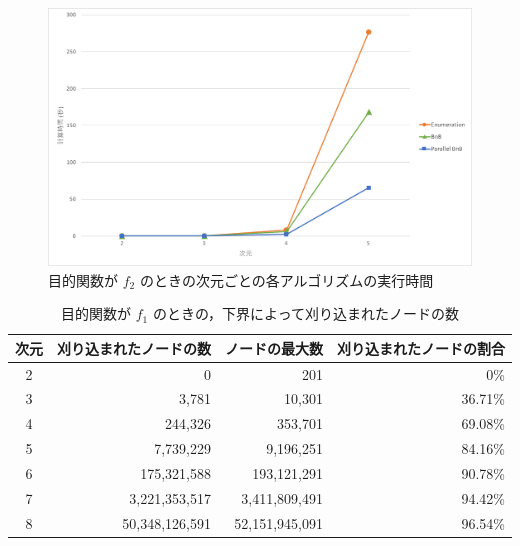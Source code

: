 \documentclass[a4paper,11pt]{jreport}
\begin{document}
\begin{figure}[h]
\begin{center}
\includegraphics[width=15cm]{graphs/f_2_time.pdf}
\caption{目的関数が $ f_2 $ のときの次元ごとの各アルゴリズムの実行時間}
\label{fig:f_2_time}
\end{center}
\end{figure}

\newpage

\begin{table}[h]
\caption{目的関数が $ f_1 $ のときの，下界によって刈り込まれたノードの数}
\label{tbl:f_1_eliminated}
\begin{center}
\begin{tabular}{|c|r|r|r|} \hline
次元 & 刈り込まれたノードの数 & ノードの最大数 & 刈り込まれたノードの割合 \\ \hline
2 & 0 & 201 & 0\% \\
3 & 3,781 & 10,301 & 36.71\% \\
4 & 244,326 & 353,701 & 69.08\% \\
5 & 7,739,229 & 9,196,251 & 84.16\% \\
6 & 175,321,588 & 193,121,291 & 90.78\% \\
7 & 3,221,353,517 & 3,411,809,491 & 94.42\% \\
8 & 50,348,126,591 & 52,151,945,091 & 96.54\% \\ \hline
\end{tabular}
\end{center}
\end{table}
\end{document}
